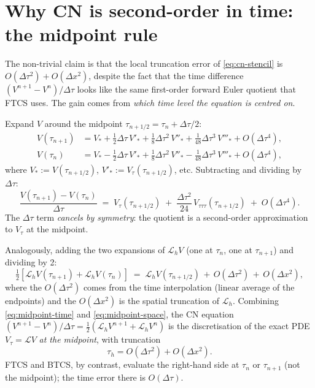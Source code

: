 \documentclass[11pt,a4paper]{article}
\begin{document}
\section{Why CN is second-order in time: the midpoint rule}
\label{sec:second-order}

The non-trivial claim is that the local truncation error of
\eqref{eq:cn-stencil} is $O(\Delta\tau^2) + O(\Delta x^2)$, despite
the fact that the time difference $(V^{n+1} - V^n)/\Delta\tau$ looks
like the same first-order forward Euler quotient that FTCS uses. The
gain comes from \emph{which time level the equation is centred on}.

Expand $V$ around the midpoint $\tau_{n+1/2} = \tau_n + \Delta\tau/2$:
\begin{align*}
V(\tau_{n+1}) &= V_* + \tfrac{1}{2}\Delta\tau\, V'_* + \tfrac{1}{8}\Delta\tau^2\, V''_*
+ \tfrac{1}{48}\Delta\tau^3\, V'''_* + O(\Delta\tau^4), \\
V(\tau_n)     &= V_* - \tfrac{1}{2}\Delta\tau\, V'_* + \tfrac{1}{8}\Delta\tau^2\, V''_*
- \tfrac{1}{48}\Delta\tau^3\, V'''_* + O(\Delta\tau^4),
\end{align*}
where $V_* := V(\tau_{n+1/2})$, $V'_* := V_\tau(\tau_{n+1/2})$, etc.
Subtracting and dividing by $\Delta\tau$:
\begin{equation}
\frac{V(\tau_{n+1}) - V(\tau_n)}{\Delta\tau}
\;=\; V_\tau(\tau_{n+1/2})
\;+\; \frac{\Delta\tau^2}{24}\,V_{\tau\tau\tau}(\tau_{n+1/2})
\;+\; O(\Delta\tau^4).
\label{eq:midpoint-time}
\end{equation}
The $\Delta\tau$ term \emph{cancels by symmetry}: the quotient is a
second-order approximation to $V_\tau$ at the midpoint.

Analogously, adding the two expansions of $\mathcal{L}_h V$ (one at
$\tau_n$, one at $\tau_{n+1}$) and dividing by 2:
\begin{equation}
\tfrac{1}{2}\!\left[\mathcal{L}_h V(\tau_{n+1}) + \mathcal{L}_h V(\tau_n)\right]
\;=\;
\mathcal{L}_h V(\tau_{n+1/2}) \,+\, O(\Delta\tau^2) \,+\, O(\Delta x^2),
\label{eq:midpoint-space}
\end{equation}
where the $O(\Delta\tau^2)$ comes from the time interpolation (linear
average of the endpoints) and the $O(\Delta x^2)$ is the spatial
truncation of $\mathcal{L}_h$. Combining \eqref{eq:midpoint-time} and
\eqref{eq:midpoint-space}, the CN equation
$(V^{n+1} - V^n)/\Delta\tau = \frac12(\mathcal{L}_h V^{n+1} + \mathcal{L}_h V^n)$
is the discretisation of the exact PDE $V_\tau = \mathcal{L} V$
\emph{at the midpoint}, with truncation
\[
\tau_h = O(\Delta\tau^2) + O(\Delta x^2).
\]
FTCS and BTCS, by contrast, evaluate the right-hand side at $\tau_n$ or
$\tau_{n+1}$ (not the midpoint); the time error there is $O(\Delta\tau)$.
\end{document}
